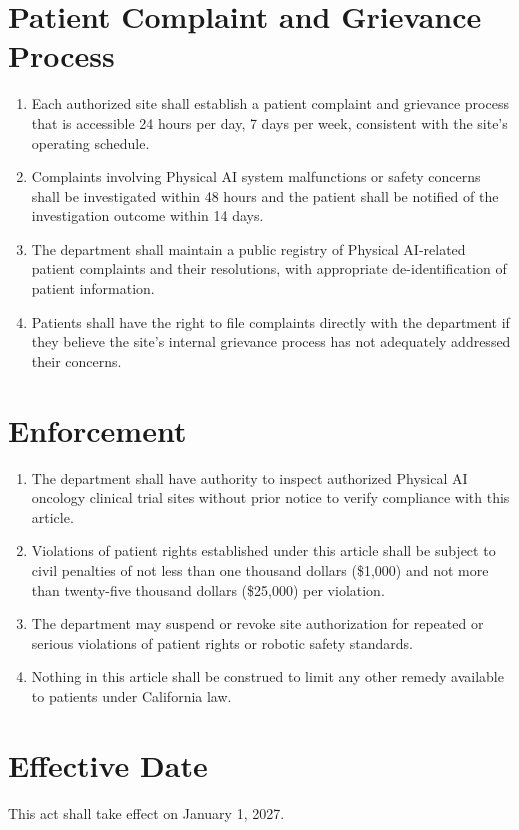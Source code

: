 \section{Patient Complaint and Grievance Process}

\begin{enumerate}[label=(\alph*)]
\item Each authorized site shall establish a patient complaint and grievance
  process that is accessible 24 hours per day, 7 days per week, consistent
  with the site's operating schedule.

\item Complaints involving Physical AI system malfunctions or safety concerns
  shall be investigated within 48 hours and the patient shall be notified of
  the investigation outcome within 14 days.

\item The department shall maintain a public registry of Physical AI-related
  patient complaints and their resolutions, with appropriate de-identification
  of patient information.

\item Patients shall have the right to file complaints directly with the
  department if they believe the site's internal grievance process has not
  adequately addressed their concerns.
\end{enumerate}

\section{Enforcement}

\begin{enumerate}[label=(\alph*)]
\item The department shall have authority to inspect authorized Physical AI
  oncology clinical trial sites without prior notice to verify compliance
  with this article.

\item Violations of patient rights established under this article shall be
  subject to civil penalties of not less than one thousand dollars (\$1,000)
  and not more than twenty-five thousand dollars (\$25,000) per violation.

\item The department may suspend or revoke site authorization for repeated or
  serious violations of patient rights or robotic safety standards.

\item Nothing in this article shall be construed to limit any other remedy
  available to patients under California law.
\end{enumerate}

\section{Effective Date}

This act shall take effect on January 1, 2027.

